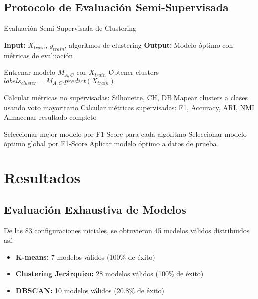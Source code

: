 \documentclass[12pt,a4paper]{article}
\begin{document}
\subsection{Protocolo de Evaluación Semi-Supervisada}

\begin{algorithm}
\caption{Evaluación Semi-Supervisada de Clustering}
\begin{algorithmic}[1]
\State \textbf{Input:} $X_{train}$, $y_{train}$, algoritmos de clustering
\State \textbf{Output:} Modelo óptimo con métricas de evaluación

        \State Entrenar modelo $M_{A,C}$ con $X_{train}$
        \State Obtener clusters $labels_{cluster} = M_{A,C}.predict(X_{train})$
        
            \State Calcular métricas no supervisadas: Silhouette, CH, DB
            \State Mapear clusters a clases usando voto mayoritario
            \State Calcular métricas supervisadas: F1, Accuracy, ARI, NMI
            \State Almacenar resultado completo
        \EndIf
    \EndFor
\EndFor

\State Seleccionar mejor modelo por F1-Score para cada algoritmo
\State Seleccionar modelo óptimo global por F1-Score
\State Aplicar modelo óptimo a datos de prueba
\end{algorithmic}
\end{algorithm}

\section{Resultados}

\subsection{Evaluación Exhaustiva de Modelos}

De las 83 configuraciones iniciales, se obtuvieron 45 modelos válidos distribuidos así:
\begin{itemize}
    \item \textbf{K-means:} 7 modelos válidos (100\% de éxito)
    \item \textbf{Clustering Jerárquico:} 28 modelos válidos (100\% de éxito)
    \item \textbf{DBSCAN:} 10 modelos válidos (20.8\% de éxito)
\end{itemize}
\end{document}
